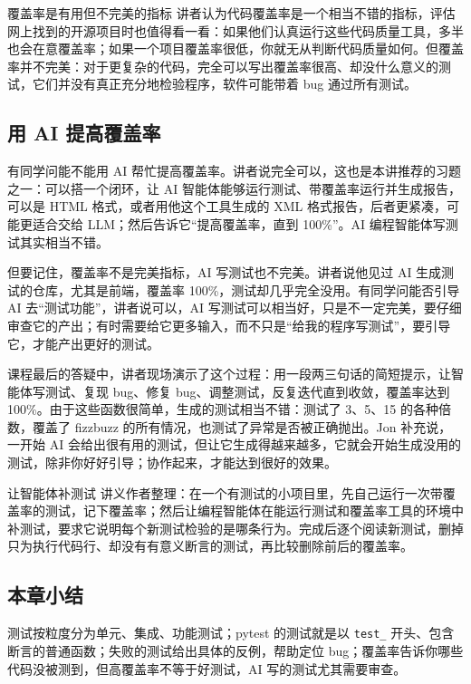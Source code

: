 \documentclass[a4paper]{article}
\begin{document}
\begin{importantbox}{覆盖率是有用但不完美的指标}
讲者认为代码覆盖率是一个相当不错的指标，评估网上找到的开源项目时也值得看一看：如果他们认真运行这些代码质量工具，多半也会在意覆盖率；如果一个项目覆盖率很低，你就无从判断代码质量如何。但覆盖率并不完美：对于更复杂的代码，完全可以写出覆盖率很高、却没什么意义的测试，它们并没有真正充分地检验程序，软件可能带着 bug 通过所有测试。
\end{importantbox}

\subsection{用 AI 提高覆盖率}

有同学问能不能用 AI 帮忙提高覆盖率。讲者说完全可以，这也是本讲推荐的习题之一：可以搭一个闭环，让 AI 智能体能够运行测试、带覆盖率运行并生成报告，可以是 HTML 格式，或者用他这个工具生成的 XML 格式报告，后者更紧凑，可能更适合交给 LLM；然后告诉它“提高覆盖率，直到 100\%”。AI 编程智能体写测试其实相当不错。

但要记住，覆盖率不是完美指标，AI 写测试也不完美。讲者说他见过 AI 生成测试的仓库，尤其是前端，覆盖率 100\%，测试却几乎完全没用。有同学问能否引导 AI 去“测试功能”，讲者说可以，AI 写测试可以相当好，只是不一定完美，要仔细审查它的产出；有时需要给它更多输入，而不只是“给我的程序写测试”，要引导它，才能产出更好的测试。

课程最后的答疑中，讲者现场演示了这个过程：用一段两三句话的简短提示，让智能体写测试、复现 bug、修复 bug、调整测试，反复迭代直到收敛，覆盖率达到 100\%。由于这些函数很简单，生成的测试相当不错：测试了 3、5、15 的各种倍数，覆盖了 fizzbuzz 的所有情况，也测试了异常是否被正确抛出。Jon 补充说，一开始 AI 会给出很有用的测试，但让它生成得越来越多，它就会开始生成没用的测试，除非你好好引导；协作起来，才能达到很好的效果。

\begin{practicebox}{让智能体补测试}
讲义作者整理：在一个有测试的小项目里，先自己运行一次带覆盖率的测试，记下覆盖率；然后让编程智能体在能运行测试和覆盖率工具的环境中补测试，要求它说明每个新测试检验的是哪条行为。完成后逐个阅读新测试，删掉只为执行代码行、却没有有意义断言的测试，再比较删除前后的覆盖率。
\end{practicebox}

\subsection{本章小结}

测试按粒度分为单元、集成、功能测试；pytest 的测试就是以 \texttt{test\_} 开头、包含断言的普通函数；失败的测试给出具体的反例，帮助定位 bug；覆盖率告诉你哪些代码没被测到，但高覆盖率不等于好测试，AI 写的测试尤其需要审查。
\end{document}
